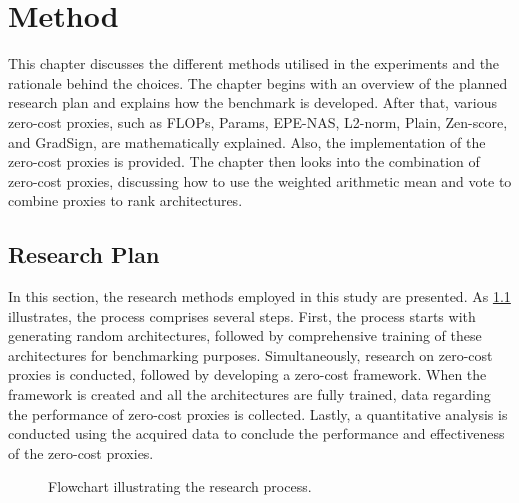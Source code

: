 \chapter{Method}\label{method}
This chapter discusses the different methods utilised in the experiments and the rationale behind the choices. The chapter begins with an overview of the planned research plan and explains how the benchmark is developed. After that, various zero-cost proxies, such as \gls{FLOPs}, Params, EPE-NAS, L2-norm, Plain, Zen-score, and GradSign, are mathematically explained. Also, the implementation of the zero-cost proxies is provided. The chapter then looks into the combination of zero-cost proxies, discussing how to use the weighted arithmetic mean and vote to combine proxies to rank architectures.

\section{Research Plan}
In this section, the research methods employed in this study are presented. As \cref{fig:research_flowchart} illustrates, the process comprises several steps. First, the process starts with generating random architectures, followed by comprehensive training of these architectures for benchmarking purposes. Simultaneously, research on zero-cost proxies is conducted, followed by developing a zero-cost framework. When the framework is created and all the architectures are fully trained, data regarding the performance of zero-cost proxies is collected. Lastly, a quantitative analysis is conducted using the acquired data to conclude the performance and effectiveness of the zero-cost proxies.

\clearpage

\begin{figure}[htbp]
  \centering
  \caption{Flowchart illustrating the research process.}
  \label{fig:research_flowchart}
\end{figure}







